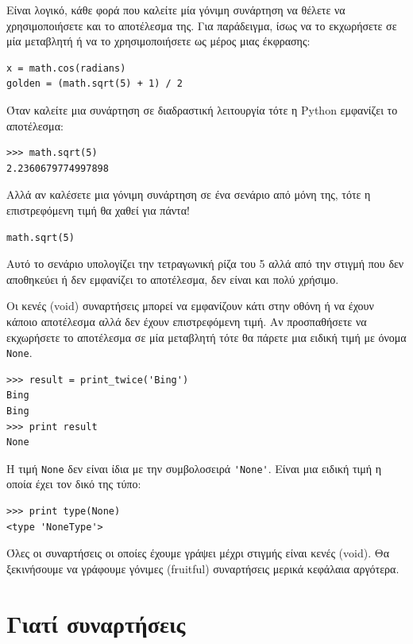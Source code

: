 \documentclass[10pt]{book}
\begin{document}
Είναι λογικό, κάθε φορά που καλείτε μία γόνιμη συνάρτηση να θέλετε να χρησιμοποιήσετε και το αποτέλεσμα της. Για παράδειγμα, ίσως να το εκχωρήσετε σε μία μεταβλητή ή να το χρησιμοποιήσετε ως μέρος μιας έκφρασης: 


\begin{verbatim}
x = math.cos(radians)
golden = (math.sqrt(5) + 1) / 2
\end{verbatim}
%

Όταν καλείτε μια συνάρτηση σε διαδραστική λειτουργία τότε η Python 
εμφανίζει το αποτέλεσμα:


\begin{verbatim}
>>> math.sqrt(5)
2.2360679774997898
\end{verbatim}
%

Αλλά αν καλέσετε μια γόνιμη συνάρτηση σε ένα σενάριο από μόνη της, τότε
η επιστρεφόμενη τιμή θα χαθεί για πάντα!


\begin{verbatim}
math.sqrt(5)
\end{verbatim}
%

Αυτό το σενάριο υπολογίζει την τετραγωνική ρίζα του 5 αλλά από την στιγμή που
δεν αποθηκεύει ή δεν εμφανίζει το αποτέλεσμα, δεν είναι και πολύ χρήσιμο.

Οι κενές (void) συναρτήσεις μπορεί να εμφανίζουν κάτι στην οθόνη ή να έχουν κάποιο αποτέλεσμα αλλά δεν έχουν επιστρεφόμενη τιμή. Αν προσπαθήσετε να εκχωρήσετε το αποτέλεσμα σε μία μεταβλητή τότε θα πάρετε μια ειδική τιμή με όνομα {\tt None}.

\begin{verbatim}
>>> result = print_twice('Bing')
Bing
Bing
>>> print result
None
\end{verbatim}
%

Η τιμή {\tt None} δεν είναι ίδια με την συμβολοσειρά \verb"'None'".
Είναι μια ειδική τιμή η οποία έχει τον δικό της τύπο:


\begin{verbatim}
>>> print type(None)
<type 'NoneType'>
\end{verbatim}
%

Όλες οι συναρτήσεις οι οποίες έχουμε γράψει μέχρι στιγμής είναι κενές (void). 
Θα ξεκινήσουμε να γράφουμε γόνιμες (fruitful) συναρτήσεις μερικά κεφάλαια αργότερα.


\section{Γιατί συναρτήσεις}
\end{document}
